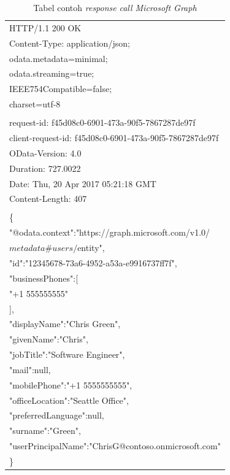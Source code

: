 \begin{table}[H]
	\centering 
	\caption{Tabel contoh \textit{response} \textit{call Microsoft Graph}}
	\label{tab:contoh_response_call_microsoft_graph}
	\begin{tabular}{|p{12cm}|}
	\toprule
	HTTP/1.1 200 OK\\
Content-Type: application/json;\\
odata.metadata=minimal;\\
odata.streaming=true;\\
IEEE754Compatible=false;\\
charset=utf-8\\
\\
request-id: f45d08c0-6901-473a-90f5-7867287de97f\\
client-request-id: f45d08c0-6901-473a-90f5-7867287de97f\\
OData-Version: 4.0\\
Duration: 727.0022\\
Date: Thu, 20 Apr 2017 05:21:18 GMT\\
Content-Length: 407\\
\\
\{\\
    "@odata.context":"https://graph.microsoft.com/v1.0/\\
    $metadata\#users/$entity",\\
    "id":"12345678-73a6-4952-a53a-e9916737ff7f",\\
    "businessPhones":[\\
        "+1 555555555"\\
    ],\\
    "displayName":"Chris Green",\\
    "givenName":"Chris",\\
    "jobTitle":"Software Engineer",\\
    "mail":null,\\
    "mobilePhone":"+1 5555555555",\\
    "officeLocation":"Seattle Office",\\
    "preferredLanguage":null,\\
    "surname":"Green",\\
    "userPrincipalName":"ChrisG@contoso.onmicrosoft.com"\\
\}\\
	\bottomrule
	\end{tabular}  
\end{table}

